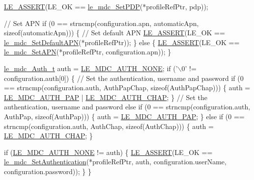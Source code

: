 \begin{DoxyCodeInclude}
    \hyperlink{le__log_8h_ac0dbbef91dc0fed449d0092ff0557b39}{LE\_ASSERT}(LE\_OK == \hyperlink{le__mdc__interface_8h_a73e66a7a63dc95d7f261fc2a26470386}{le\_mdc\_SetPDP}(*profileRefPtr, pdp));

    \textcolor{comment}{// Set APN}
    \textcolor{keywordflow}{if} (0 == strncmp(configuration.apn, automaticApn, \textcolor{keyword}{sizeof}(automaticApn)))
    \{
        \textcolor{comment}{// Set default APN}
        \hyperlink{le__log_8h_ac0dbbef91dc0fed449d0092ff0557b39}{LE\_ASSERT}(LE\_OK == \hyperlink{le__mdc__interface_8h_ad44bd756fd5cbfd43a5b348054786a4d}{le\_mdc\_SetDefaultAPN}(*profileRefPtr));
    \}
    \textcolor{keywordflow}{else}
    \{
        \hyperlink{le__log_8h_ac0dbbef91dc0fed449d0092ff0557b39}{LE\_ASSERT}(LE\_OK == \hyperlink{le__mdc__interface_8h_ae8ebd11b9cb9afb9b6b5745903f50156}{le\_mdc\_SetAPN}(*profileRefPtr, configuration.apn));
    \}

    \hyperlink{le__mdc__interface_8h_ae9758eecfab89fbc1bc01341393a7723}{le\_mdc\_Auth\_t} auth = \hyperlink{le__mdc__interface_8h_ae9758eecfab89fbc1bc01341393a7723a10fb016f4d6f7a7e893cf66846c24de2}{LE\_MDC\_AUTH\_NONE};
    \textcolor{keywordflow}{if} (\textcolor{charliteral}{'\(\backslash\)0'} != configuration.auth[0])
    \{
        \textcolor{comment}{// Set the authentication, username and password}
        \textcolor{keywordflow}{if} (0 == strncmp(configuration.auth, AuthPapChap, \textcolor{keyword}{sizeof}(AuthPapChap)))
        \{
            auth = \hyperlink{le__mdc__interface_8h_ae9758eecfab89fbc1bc01341393a7723a151065be441aa8f065d0ead3d739b6f0}{LE\_MDC\_AUTH\_PAP} | \hyperlink{le__mdc__interface_8h_ae9758eecfab89fbc1bc01341393a7723ae93a464a7ee2f31346aa01676afc7054}{LE\_MDC\_AUTH\_CHAP};
        \}
        \textcolor{comment}{// Set the authentication, username and password}
        \textcolor{keywordflow}{else} \textcolor{keywordflow}{if} (0 == strncmp(configuration.auth, AuthPap, \textcolor{keyword}{sizeof}(AuthPap)))
        \{
            auth = \hyperlink{le__mdc__interface_8h_ae9758eecfab89fbc1bc01341393a7723a151065be441aa8f065d0ead3d739b6f0}{LE\_MDC\_AUTH\_PAP};
        \}
        \textcolor{keywordflow}{else} \textcolor{keywordflow}{if} (0 == strncmp(configuration.auth, AuthChap, \textcolor{keyword}{sizeof}(AuthChap)))
        \{
            auth = \hyperlink{le__mdc__interface_8h_ae9758eecfab89fbc1bc01341393a7723ae93a464a7ee2f31346aa01676afc7054}{LE\_MDC\_AUTH\_CHAP};
        \}

        \textcolor{keywordflow}{if} (\hyperlink{le__mdc__interface_8h_ae9758eecfab89fbc1bc01341393a7723a10fb016f4d6f7a7e893cf66846c24de2}{LE\_MDC\_AUTH\_NONE} != auth)
        \{
            \hyperlink{le__log_8h_ac0dbbef91dc0fed449d0092ff0557b39}{LE\_ASSERT}(LE\_OK == \hyperlink{le__mdc__interface_8h_a9f69d0751927b5ead6c756202179b222}{le\_mdc\_SetAuthentication}(*profileRefPtr,
                                                auth,
                                                configuration.userName,
                                                configuration.password));
        \}
    \}


\end{DoxyCodeInclude}
